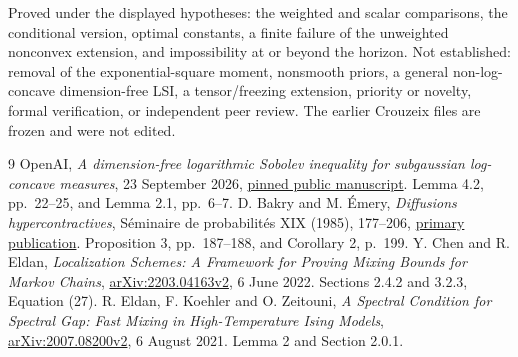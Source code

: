 \documentclass[11pt]{article}
\theoremstyle{remark}\newtheorem{remark}[theorem]{Remark}
\begin{document}
Proved under the displayed hypotheses: the weighted and scalar comparisons,
the conditional version, optimal constants, a finite failure of the
unweighted nonconvex extension, and impossibility at or beyond the horizon.
Not established: removal of the exponential-square moment, nonsmooth priors,
a general non-log-concave dimension-free LSI, a tensor/freezing extension,
priority or novelty, formal verification, or independent peer review.
The earlier Crouzeix files are frozen and were not edited.

\begin{thebibliography}{9}
 OpenAI, \emph{A dimension-free logarithmic Sobolev inequality for
subgaussian log-concave measures}, 23 September 2026,
\href{https://github.com/openai/math/blob/adc7f1241b42e322a6451854ab7e4b4c146bf78a/preprints/A-dimension-free-logarithmic-Sobolev-inequality-for-subgaussian-log-concave-measures-September-23-2026/paper.pdf}{pinned public manuscript}.
Lemma 4.2, pp.\ 22--25, and Lemma 2.1, pp.\ 6--7.
 D. Bakry and M. \'Emery, \emph{Diffusions hypercontractives},
S\'eminaire de probabilit\'es XIX (1985), 177--206,
\href{https://www.numdam.org/item/SPS_1985__19__177_0/}{primary publication}.
Proposition 3, pp.\ 187--188, and Corollary 2, p.\ 199.
 Y. Chen and R. Eldan, \emph{Localization Schemes: A Framework for
Proving Mixing Bounds for Markov Chains},
\href{https://arxiv.org/abs/2203.04163v2}{arXiv:2203.04163v2}, 6 June 2022.
Sections 2.4.2 and 3.2.3, Equation (27).
 R. Eldan, F. Koehler and O. Zeitouni, \emph{A Spectral Condition
for Spectral Gap: Fast Mixing in High-Temperature Ising Models},
\href{https://arxiv.org/abs/2007.08200v2}{arXiv:2007.08200v2}, 6 August 2021.
Lemma 2 and Section 2.0.1.
\end{thebibliography}
\end{document}
